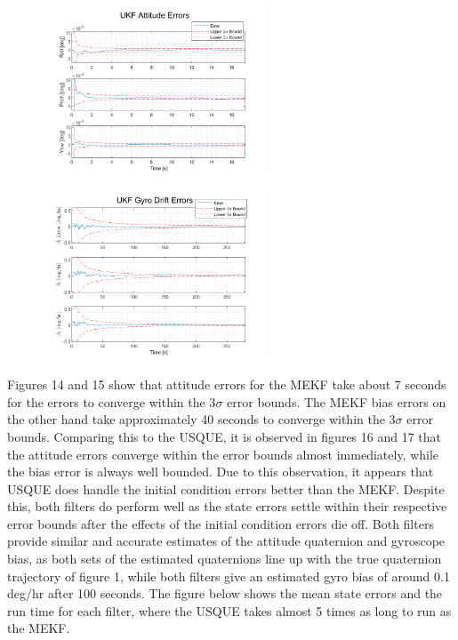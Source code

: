 \documentclass[12pt]{report}
\begin{document}
\begin{figure}[h!]
	\centering
	\begin{minipage}{.5\textwidth}
		\centering
		\includegraphics[height=5cm, keepaspectratio]{ukfAttErrBegin.png}
		\label{fig:ex1}
	\end{minipage}%
	\begin{minipage}{.5\textwidth}
		\centering
		\includegraphics[height=5cm, keepaspectratio]{ukfBiasErrBegin.png}
		\label{fig:ex2}
	\end{minipage}
\end{figure}

\noindent Figures 14 and 15 show that attitude errors for the MEKF take about 7 seconds for the errors to converge within the 3$\sigma$ error bounds. The MEKF bias errors on the other hand take approximately 40 seconds to converge within the 3$\sigma$ error bounds. Comparing this to the USQUE, it is observed in figures 16 and 17 that the attitude errors converge within the error bounds almost immediately, while the bias error is always well bounded. Due to this observation, it appears that USQUE does handle the initial condition errors better than the MEKF. Despite this, both filters do perform well as the state errors settle within their respective error bounds after the effects of the initial condition errors die off. Both filters provide similar and accurate estimates of the attitude quaternion and gyroscope bias, as both sets of the estimated quaternions line up with the true quaternion trajectory of figure 1, while both filters give an estimated gyro bias of around 0.1 deg/hr after 100 seconds. The figure below shows the mean state errors and the run time for each filter, where the USQUE takes almost 5 times as long to run as the MEKF. 
\end{document}
